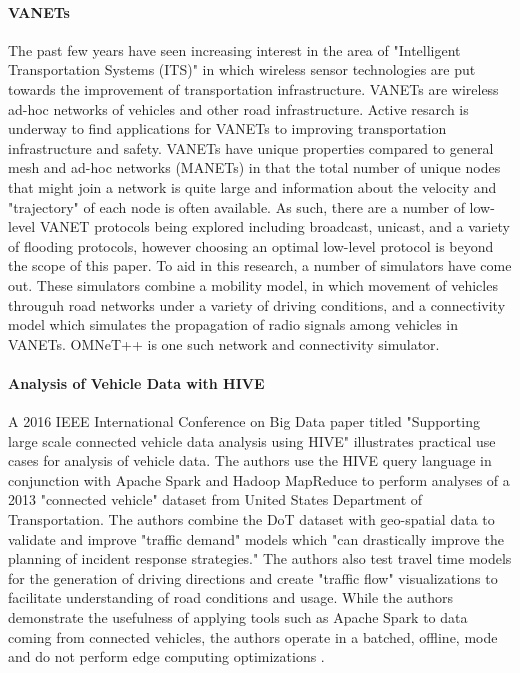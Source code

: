 \documentclass{thesis}
\begin{document}
        \paragraph{VANETs}
            The past few years have seen increasing interest in the area of "Intelligent Transportation
            Systems (ITS)" in which wireless sensor technologies are put towards the improvement of
            transportation infrastructure. VANETs are wireless ad-hoc networks of vehicles and other
            road infrastructure. Active resarch is underway to find applications for VANETs to improving
            transportation infrastructure and safety. 
            VANETs have unique properties compared to general mesh and ad-hoc networks (MANETs) in that
            the total number of unique nodes that might join a network is quite large and information
            about the velocity and "trajectory" of each node is often available.
            As such, there are a number of low-level VANET protocols being explored including broadcast,
            unicast, and a variety of flooding protocols, however choosing an optimal low-level protocol is 
            beyond the scope of this paper.
            To aid in this research, a number of simulators have
            come out. These simulators combine a mobility model, in which movement of vehicles througuh road
            networks under a variety of driving conditions, and a connectivity model which simulates the
            propagation of radio signals among vehicles in VANETs. OMNeT++ is one such network and connectivity
            simulator.
        \paragraph{Analysis of Vehicle Data with HIVE}
            A 2016 IEEE International Conference on Big Data paper titled "Supporting large scale
            connected vehicle data analysis using HIVE" illustrates practical use cases for analysis
            of vehicle data. The authors use the HIVE \cite{hive} query language in conjunction with Apache Spark
            \cite{spark} and Hadoop MapReduce \cite{hdfs}
            to perform analyses of a 2013 "connected vehicle" dataset from
            United States Department of Transportation. The authors combine the DoT dataset with
            geo-spatial data to validate and improve "traffic demand" models which "can drastically
            improve the planning of incident response strategies." The authors also test travel
            time models for the generation of driving directions and create "traffic flow" visualizations
            to facilitate understanding of road conditions and usage. While the authors demonstrate the 
            usefulness of applying tools such as Apache Spark to data coming from connected vehicles, the
            authors operate in a batched, offline, mode and do not perform edge computing optimizations \cite{cv:hive}.
\end{document}
